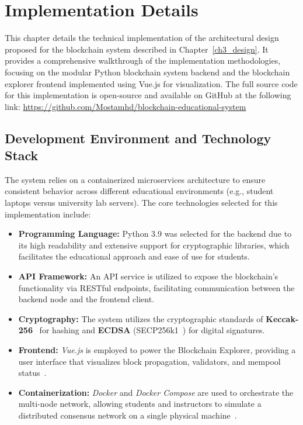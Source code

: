 \chapter{Implementation Details} \label{ch4_implementation}

This chapter details the technical implementation of the architectural design proposed for the blockchain system described in Chapter~\ref{ch3_design}. It provides a comprehensive walkthrough of the implementation methodologies, focusing on the modular Python blockchain system backend and the blockchain explorer frontend implemented using Vue.js for visualization.
The full source code for this implementation is open-source and available on GitHub at the following link: \url{https://github.com/Mostamhd/blockchain-educational-system}

\section{Development Environment and Technology Stack} \label{ch4_tech_stack}

The system relies on a containerized microservices architecture to ensure consistent behavior across different educational environments (e.g., student laptops versus university lab servers). The core technologies selected for this implementation include:

\begin{itemize}
    \item \textbf{Programming Language:} Python 3.9 was selected for the backend due to its high readability and extensive support for cryptographic libraries, which facilitates the educational approach and ease of use for students.
    \item \textbf{API Framework:} An API service is utilized to expose the blockchain's functionality via RESTful endpoints, facilitating communication between the backend node and the frontend client.
    \item \textbf{Cryptography:} The system utilizes the cryptographic standards of \textbf{Keccak-256}~\cite{Keccak} for hashing and \textbf{ECDSA} (SECP256k1~\cite{sinai2024quantumsecp256k1}) for digital signatures.
    \item \textbf{Frontend:} \textit{Vue.js} is employed to power the Blockchain Explorer, providing a user interface that visualizes block propagation, validators, and mempool status~\cite{vuejs}.
    \item \textbf{Containerization:} \textit{Docker} and \textit{Docker Compose} are used to orchestrate the multi-node network, allowing students and instructors to simulate a distributed consensus network on a single physical machine~\cite{docker}.
\end{itemize}

